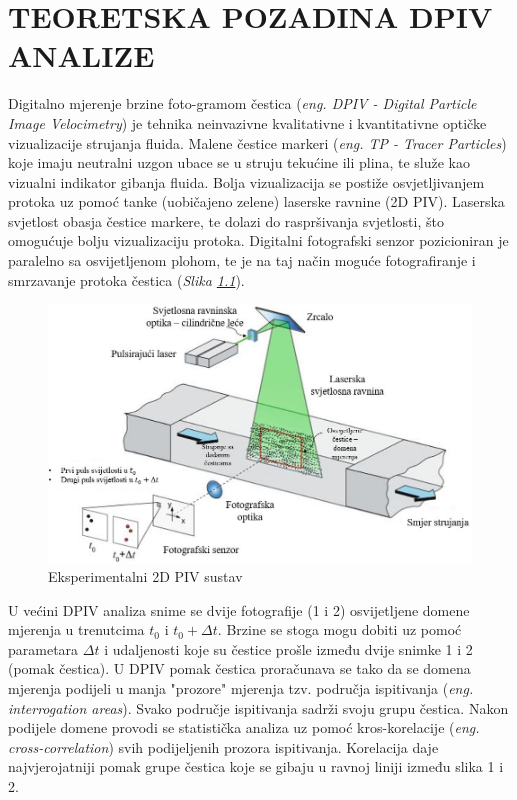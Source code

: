 
\chapter{TEORETSKA POZADINA DPIV ANALIZE}
\label{chap:Poglavlje_2}

Digitalno mjerenje brzine foto-gramom čestica (\textit{eng. DPIV - Digital Particle Image Velocimetry}) je tehnika neinvazivne kvalitativne i kvantitativne optičke vizualizacije strujanja fluida. Malene čestice markeri (\textit{eng. TP - Tracer Particles}) koje imaju neutralni uzgon ubace se u struju tekućine ili plina, te služe kao vizualni indikator gibanja fluida. Bolja vizualizacija se postiže osvjetljivanjem protoka uz pomoć tanke (uobičajeno zelene) laserske ravnine (2D PIV). Laserska svjetlost obasja čestice markere, te dolazi do raspršivanja svjetlosti, što omogućuje bolju vizualizaciju protoka. Digitalni fotografski senzor pozicioniran je paralelno sa osvijetljenom plohom, te je na taj način moguće fotografiranje i smrzavanje protoka čestica (\textit{Slika \ref{sl:2.1}}).
\begin{figure}[h]
	\centering
	\includegraphics[width=14cm]{./2_DPIV/2_1PivSetup.jpg} 
	\caption{Eksperimentalni 2D PIV sustav \cite{raffel2018_book}}
	\label{sl:2.1}
\end{figure}
\par
U većini DPIV analiza snime se dvije fotografije (1 i 2) osvijetljene domene mjerenja u trenutcima $t_0$ i $t_0+\Delta t$. Brzine se stoga mogu dobiti uz pomoć parametara $\Delta t$ i udaljenosti koje su čestice prošle između dvije snimke 1 i 2 (pomak čestica). U DPIV pomak čestica proračunava se tako da se domena mjerenja podijeli u manja "prozore" mjerenja tzv. područja ispitivanja (\textit{eng. interrogation areas}). Svako područje ispitivanja sadrži svoju grupu čestica. Nakon podijele domene provodi se statistička analiza uz pomoć kros-korelacije (\textit{eng. cross-correlation}) svih podijeljenih prozora ispitivanja. Korelacija daje najvjerojatniji pomak grupe čestica koje se gibaju u ravnoj liniji između slika 1 i 2.
